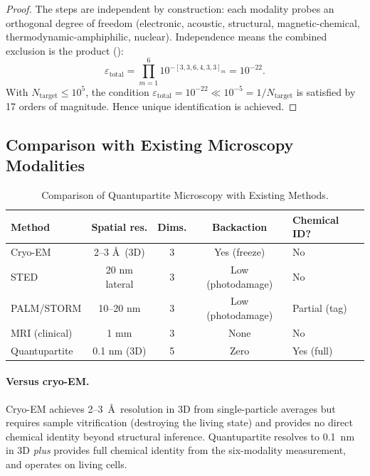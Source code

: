 \begin{proof}
The steps are independent by construction: each modality probes an
orthogonal degree of freedom (electronic, acoustic, structural,
magnetic-chemical, thermodynamic-amphiphilic, nuclear).  Independence means
the combined exclusion is the product ():
\begin{equation}
    \varepsilon_{\mathrm{total}}
        = \prod_{m=1}^{6} 10^{-[3,3,6,4,3,3]_m}
        = 10^{-22}.
\end{equation}
With $N_{\mathrm{target}} \leq 10^5$, the condition
$\varepsilon_{\mathrm{total}} = 10^{-22} \ll 10^{-5} = 1/N_{\mathrm{target}}$
is satisfied by 17 orders of magnitude.  Hence unique identification is
achieved.
\end{proof}

\subsection{Comparison with Existing Microscopy Modalities}

\begin{table}[ht]
\centering
\caption{Comparison of Quantupartite Microscopy with Existing Methods.}
\label{tab:ch04-microscopy-comparison}
\begin{tabular}{lcccl}
\toprule
Method & Spatial res. & Dims. & Backaction & Chemical ID? \\
\midrule
Cryo-EM & 2--3 \AA\ (3D) & 3 & Yes (freeze) & No \\
STED & 20 nm lateral & 3 & Low (photodamage) & No \\
PALM/STORM & 10--20 nm & 3 & Low (photodamage) & Partial (tag) \\
MRI (clinical) & 1 mm & 3 & None & No \\
Quantupartite & 0.1 nm (3D) & 5 & Zero & Yes (full) \\
\bottomrule
\end{tabular}
\end{table}

\paragraph{Versus cryo-EM.}
Cryo-EM achieves 2--3~\AA\ resolution in 3D from single-particle averages
but requires sample vitrification (destroying the living state) and provides
no direct chemical identity beyond structural inference.  Quantupartite
resolves to 0.1~nm in 3D \emph{plus} provides full chemical identity from
the six-modality measurement, and operates on living cells.

